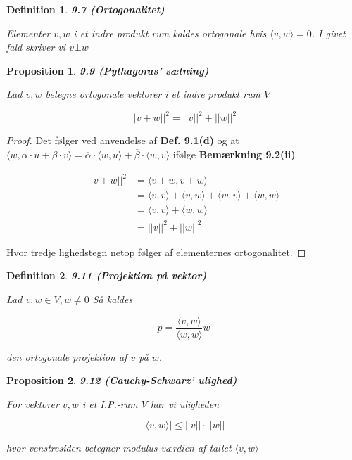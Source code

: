 \documentclass[paper=a4, fontsize=11pt]{scrartcl} %
\newtheorem*{definition}{Definition}
\newtheorem*{proposition}{Proposition}
\newenvironment{cstmproposition}[1]{\begin{proposition} {\normalfont\textbf{#1}}}{\end{proposition}}
\newenvironment{cstmdefinition}[1]{\begin{definition} {\normalfont\textbf{#1}}}{\end{definition}}
\begin{document}
	
	\begin{cstmdefinition}{9.7 (Ortogonalitet)}
		
		Elementer $v,w$ i et indre produkt rum kaldes ortogonale hvis $\langle v,w \rangle = 0$. I givet fald skriver vi $v \bot w$ 
		
	\end{cstmdefinition}
	
	
	\begin{cstmproposition}{9.9 (Pythagoras' sætning)}
		
		Lad $v,w$ betegne ortogonale vektorer i et indre produkt rum $V$
		
		\[||v + w||^2 = ||v||^2 + ||w||^2\]
		
	\end{cstmproposition}
	
	
	\begin{proof}
		Det følger ved anvendelse af \textbf{Def. 9.1(d)} og at $\langle w , \alpha \cdot u + \beta \cdot v \rangle = \overline{\alpha} \cdot \langle w , u \rangle + \overline{\beta} \cdot \langle w,v \rangle$ ifølge \textbf{Bemærkning 9.2(ii)}
		
		\begin{align*}
		||v + w||^2 &= \langle v + w , v + w \rangle\\
		&= \langle v,v \rangle + \langle v , w \rangle + \langle w , v \rangle + \langle w,w \rangle\\
		&= \langle v,v \rangle + \langle w,w \rangle \\
		&= ||v||^2 + ||w||^2
		\end{align*}
		
		Hvor tredje lighedstegn netop følger af elementernes ortogonalitet.
		
	\end{proof}
	
	\begin{cstmdefinition}{9.11 (Projektion på vektor)}
		
		Lad $v,w \in V , w \not = 0$ Så kaldes 
		
		\[p = \frac{\langle v,w \rangle}{\langle w,w \rangle} w\]
		
		den ortogonale projektion af $v$ på $w$.
		
	\end{cstmdefinition}
	
	\begin{cstmproposition}{9.12 (Cauchy-Schwarz' ulighed)}
		
		For vektorer $v,w$ i et I.P.-rum $V$ har vi uligheden 
		
		\[|\langle v,w \rangle | \leq ||v|| \cdot ||w||\]
		
		hvor venstresiden betegner modulus værdien af tallet $\langle v,w \rangle$
		
	\end{cstmproposition}
	
\end{document}
